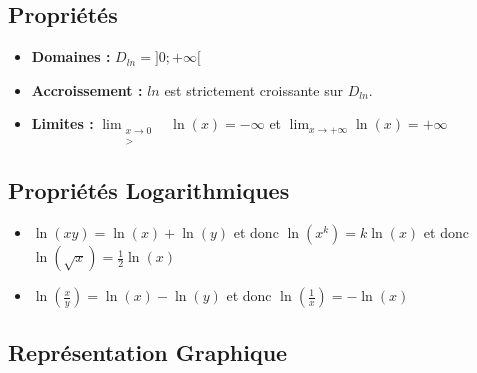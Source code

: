 \documentclass{report}
\begin{document}

    \subsection{Propriétés}

    \begin{itemize}
        \item \textbf{Domaines :} $D_{ln} = ]0; +\infty[$
        \item \textbf{Accroissement :} $ln$ est strictement croissante sur $D_{ln}$.
        \item \textbf{Limites :} \(\boxed{\lim_{\substack{x\to 0 \\ >}} ~~~\ln(x) = -\infty}\) et \(\boxed{\lim_{x \to +\infty} \ln(x) = +\infty}\)

    \end{itemize}

    \iffalse\subsection{Dérivée}

    \[
    \forall x \in \mathbb{R}^*_+ , \boxed{\quad \ln'(x) = \frac{1}{x}}
    \]\fi

    \subsection{Propriétés Logarithmiques}

    \begin{itemize}
        \item \(\boxed{\ln(xy) = \ln(x) + \ln(y)}\) et donc \(\boxed{\ln(x^k) = k \ln(x)}\) et donc \(\boxed{\ln(\sqrt{x}) = \frac{1}{2}\ln(x)}\)
        \item \(\boxed{\displaystyle \ln\left(\frac{x}{y}\right) = \ln(x) - \ln(y)}\) et donc \(\boxed{\ln\left(\frac{1}{x}\right) = -\ln(x)}\)
    \end{itemize}

    \subsection{Représentation Graphique}
\end{document}
